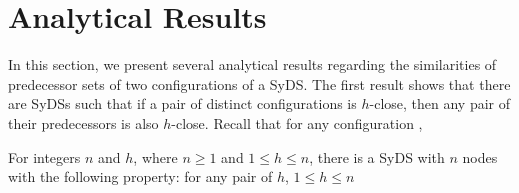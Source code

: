 \section{Analytical Results}
\label{sec:analysis}

In this section, we present several analytical results regarding the
similarities of predecessor sets of two configurations of a SyDS.
The first result shows that there are SyDSs such that 
if a pair of distinct configurations is $h$-close, then 
any pair of their predecessors is also $h$-close.
Recall that for any configuration \calc, 


\begin{proposition}\label{pro:close-positive}
For integers $n$ and $h$, where $n \geq 1$ and $1 \leq h \leq n$,
there is a SyDS \cals{} with $n$
nodes with the following property: for any pair of  $h$, $1 \leq h \leq n$
\end{proposition}

